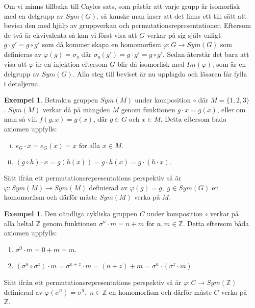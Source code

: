 \documentclass{article}
\theoremstyle{definition}
\newtheorem{exmp}[thm]{Exempel}
\begin{document}
Om vi minns tillbaka till Cayles sats, som påstår att varje grupp är isomorfisk med en delgrupp
av $Sym(G)$, så kanske man inser att det finns ett till sätt att bevisa den med hjälp av 
gruppverkan och permutationsrepresentationer. Eftersom de två är ekvivalenta så kan vi 
först visa att $G$ verkar på sig själv enligt $g \cdot g' = g \circ g'$ 
som då kommer skapa en homomorfism
$\varphi: G \rightarrow Sym(G)$ som definieras av $\varphi(g) = \sigma_g$
där $\sigma_g(g') = g \cdot g' = g \circ g'$. Sedan återstår det 
bara att visa att $\varphi$ är en injektion eftersom $G$ blir då isomorfisk med $Im(\varphi)$, 
som är en delgrupp av $Sym(G)$. Alla steg till beviset är nu upplagda och läsaren får fylla i detaljerna.

\begin{exmp}
  Betrakta gruppen $Sym(M)$ under komposition $\circ$ där 
  $M = \{1, 2, 3\}$. $Sym(M)$ verkar då på mängden $M$
  genom funktionen $g \cdot x = g(x)$, eller om man så vill $f(g, x) = g(x)$, 
  där $g \in G$ och $x \in M$. Detta eftersom båda axiomen uppfylls:
  \begin{enumerate}[(i)]
    \item $e_G \cdot x = e_G(x) = x$ för alla $x \in M$.
    \item $(g \circ h) \cdot x = g(h(x)) = g \cdot h(x) = g \cdot (h \cdot x).$
  \end{enumerate}
  Sätt ifrån ett permutationsrepresentations perspektiv så är 
  $\varphi: Sym(M) \rightarrow Sym(M)$ definierad av $\varphi(g) = g, \; g \in Sym(G)$
  en homomorfism och därför måste $Sym(M)$ verka på $M$.
\end{exmp}

\begin{exmp}
  Den oändliga cykliska gruppen $C$ under komposition $\circ$ verkar på alla heltal $\mathbb{Z}$
  genom funktionen $\sigma^n \cdot m = n + m$ för $n, m \in \mathbb{Z}$.
  Detta eftersom båda axiomen uppfylls:
  \begin{enumerate}
    \item $\sigma^0 \cdot m = 0 + m = m$.
    \item $(\sigma^n \circ \sigma^z) \cdot m = \sigma^{n + z} \cdot m = (n + z) + m = 
    \sigma^n \cdot (\sigma^z \cdot m)$.
  \end{enumerate}
  Sätt ifrån ett permutationsrepresentations perspektiv så är 
  $\varphi: C \rightarrow Sym(\mathbb{Z})$ definierad av $\varphi(\sigma^n) = \sigma^n, \; 
  n \in \mathbb{Z}$ en homomorfism och därför måste $C$ verka på $\mathbb{Z}$.
\end{exmp}
\end{document}
